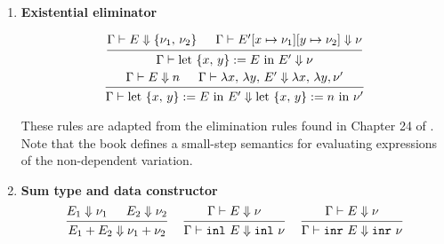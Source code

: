 \documentclass{article}
\begin{document}
\begin{enumerate}
  \item \textbf{Existential eliminator} \\
  \begin{spreadlines}{2em}
  \begin{gather*}
      \begin{prooftree}
        \hypo{\Gamma \vdash E \Downarrow \{\nu_1, \, \nu_2\}}
        \hypo{\Gamma \vdash E'[x \mapsto \nu_1][y \mapsto \nu_2] \Downarrow \nu}
        \infer2{\Gamma \vdash \text{let } \{x, \, y\} := E \text{ in } E' \Downarrow \nu}
      \end{prooftree}
      \\
      \begin{prooftree}
        \hypo{\Gamma \vdash E \Downarrow n}
        \hypo{\Gamma \vdash \lambda x, \, \lambda y, \, E' \Downarrow \lambda x, \, \lambda y, \nu'}
        \infer2{\Gamma \vdash \text{let } \{x, \, y\} := E \text{ in } E' \Downarrow
                \text{let } \{x, \, y\} := n \text{ in } \nu'}
      \end{prooftree}
    \end{gather*}
  \end{spreadlines}
    These rules are adapted from the elimination rules found
    in Chapter 24 of \cite{tapl}.
    Note that the book defines a small-step semantics for evaluating
    expressions of the non-dependent variation.


  \item \textbf{Sum type and data constructor}
  \begin{gather*}
     \begin{prooftree}
      \hypo{E_1 \Downarrow \nu_1}
      \hypo{E_2 \Downarrow \nu_2}
      \infer2{E_1 + E_2 \Downarrow \nu_1 + \nu_2}
    \end{prooftree}
    ~ \quad
    \begin{prooftree}
      \hypo{\Gamma \vdash E \Downarrow \nu}
      \infer1{\Gamma \vdash \inl \,\, E \Downarrow \inl \,\, \nu}
    \end{prooftree}  
    ~ \quad
    \begin{prooftree}
     \hypo{\Gamma \vdash E \Downarrow \nu}
     \infer1{\Gamma \vdash \inr \,\,E \Downarrow \inr \, \, \nu}
    \end{prooftree}
  \end{gather*}


\end{enumerate}
\end{document}
